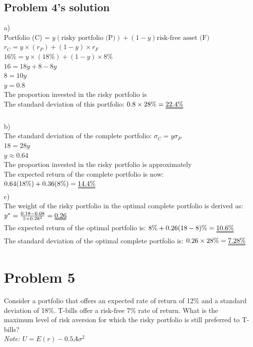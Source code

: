 \documentclass[10]{article}
\begin{document}
\subsection*{Problem 4's solution}
a)\\
Portfolio (C) = $y(\text{risky portfolio (P)}) + (1-y)\text{risk-free asset (F)}$\\
$r_C = y\times(r_P) + (1-y)\times r_F$\\
$16\% = y\times(18\%) + (1-y)\times 8\%$\\
$16 = 18y + 8 - 8y $\\
$8 = 10y$\\
$y = 0.8$\\
The proportion invested in the risky portfolio is \\
The standard deviation of this portfolio: $0.8\times28\% = \uuline{22.4\%}$\\
\\
b)\\
The standard deviation of the complete portfolio:
$\sigma_C = y\sigma_P$\\
$18 = 28y $\\ 
$y \approx 0.64$\\
The proportion invested in the risky portfolio is approximately \\
The expected return of the complete portfolio is now: $0.64(18\%) + 0.36(8\%) = \uuline{14.4\%}$\\
c)\\
The weight of the risky portfolio in the optimal complete portfolio is derived as:\\
{\large $y^* = \frac{0.18 - 0.08}{5\times0.28^2} = \uuline{0.26}$}\\
The expected return of the optimal portfolio is: $8\% + 0.26(18-8)\% = \uuline{10.6\%}$\\
The standard deviation of the optimal complete portfolio is: $0.26 \times 28\% = \uuline{7.28\%}$



\color{black}
\section*{Problem 5}
Consider a portfolio that offers an expected rate of return of 12\% and a standard deviation of 18\%. T-bills offer a risk-free 7\% rate of return. What is the maximum level of risk aversion for which the risky portfolio is still preferred to T-bills?\\
\textit{Note: $U = E(r) - 0.5A\sigma^2$}
\end{document}
